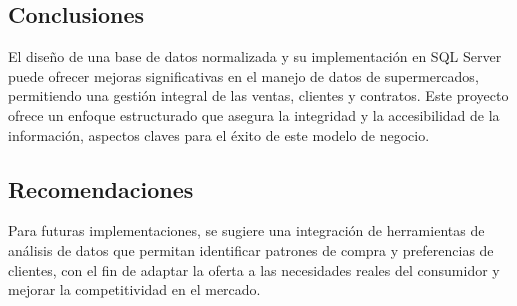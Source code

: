 \documentclass[12pt]{article}
\begin{document}
\subsection{Conclusiones}
El diseño de una base de datos normalizada y su implementación en SQL Server puede ofrecer mejoras significativas en el manejo de datos de supermercados, permitiendo una gestión integral de las ventas, clientes y contratos. Este proyecto ofrece un enfoque estructurado que asegura la integridad y la accesibilidad de la información, aspectos claves para el éxito de este modelo de negocio.

\subsection{Recomendaciones}
Para futuras implementaciones, se sugiere una integración de herramientas de análisis de datos que permitan identificar patrones de compra y preferencias de clientes, con el fin de adaptar la oferta a las necesidades reales del consumidor y mejorar la competitividad en el mercado.
\end{document}
